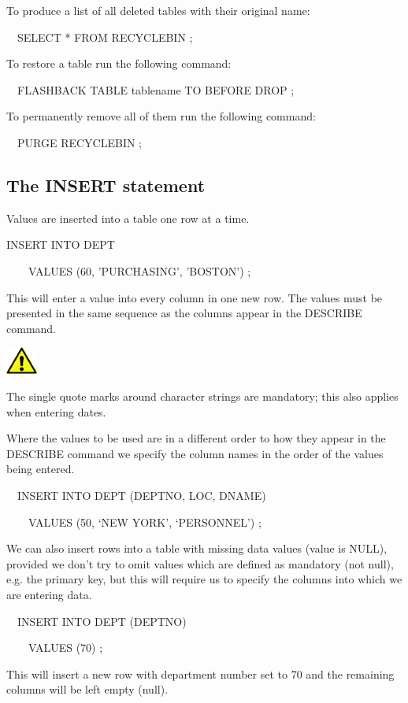 To produce a list of all deleted tables with their original name:

\ \ SELECT * FROM RECYCLEBIN ;

To restore a table run the following command: 

\ \ FLASHBACK TABLE tablename TO BEFORE DROP ;

To permanently remove all of them run the following command: 

\ \ PURGE RECYCLEBIN ;

\clearpage\subsection{The INSERT statement}
Values are inserted into a table one row at a time.

INSERT INTO DEPT

\ \ \ \ VALUES (60, 'PURCHASING', 'BOSTON') ;

This will enter a value into every column in one new row.  The values must be presented in the same sequence as the columns appear in the DESCRIBE command.



\begin{center}
  
\includegraphics[width=1.05cm,height=0.903cm]{images/img (2).png}

\end{center}
The single quote marks around character strings are mandatory; this also applies when entering dates.

Where the values to be used are in a different order to how they appear in the DESCRIBE command we specify the column names in the order of the values being entered.

\ \ INSERT INTO DEPT (DEPTNO, LOC, DNAME)

\ \ \ \ VALUES (50, `NEW YORK', `PERSONNEL') ;

We can also insert rows into a table with missing data values (value is NULL), provided we don't try to omit values which are defined as mandatory (not null), e.g. the primary key, but this will require us to specify the columns into which we are entering data.

\ \ INSERT INTO DEPT (DEPTNO)

\ \ \ \ VALUES (70) ;

This will insert a new row with department number set to 70 and the remaining columns will be left empty (null).


